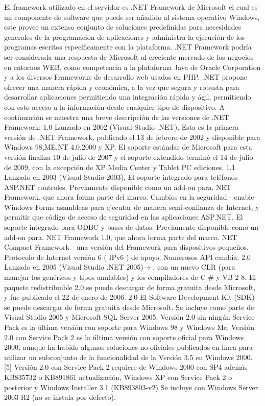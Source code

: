 El framework utilizado en el servidor es .NET Framework de Microsoft el cual es un componente de software que puede ser añadido al sistema operativo Windows, este provee un extenso conjunto de soluciones predefinidas para necesidades generales de la programacion de aplicaciones y administra la ejecución de los programas escritos específicamente con la plataforma.
.NET Framework podría ser considerada una respuesta de Microsoft al creciente mercado de los negocios en entornos WEB, como competencia a la plataforma Java de Oracle Corporation y a los diversos Frameworks de desarrollo web usados en PHP. .NET propone ofrecer una manera rápida y económica, a la vez que segura y robusta para desarrollar aplicaciones permitiendo una integración rápida y ágil, permitiendo con esto acceso a la información desde cualquier tipo de dispositivo.
A continuación se muestra una breve descripción de las versiones de .NET Framework:
1.0
Lanzado en 2002 (Visual Studio .NET), Esta es la primera versión de .NET Framework, publicado el 13 de febrero de 2002 y disponible para Windows 98,ME,NT 4.0,2000 y XP. El soporte estándar de Microsoft para esta versión finaliza 10 de julio de 2007 y el soporte extendido terminó el 14 de julio de 2009, con la excepción de XP Media Center y Tablet PC ediciones. 
1.1
Lanzado en 2003 (Visual Studio 2003), El soporte integrado para teléfonos ASP.NET controles. Previamente disponible como un add-on para. NET Framework, que ahora forma parte del marco. Cambios en la seguridad - enable Windows Forms asambleas para ejecutar de manera semi-confianza de Internet, y permitir que código de acceso de seguridad en las aplicaciones ASP.NET. El soporte integrado para ODBC y bases de datos. Previamente disponible como un add-on para. NET Framework 1.0, que ahora forma parte del marco. NET Compact Framework - una versión del Framework para dispositivos pequeños. Protocolo de Internet versión 6 ( IPv6 ) de apoyo. Numerosos API cambia.
2.0
Lanzado en 2005 (Visual Studio .NET 2005)→ , con un nuevo CLR (para manejar los genéricos y tipos anulables) y los compiladores de C \# y VB 2 8.
El paquete redistribuible 2.0 se puede descargar de forma gratuita desde Microsoft, y fue publicado el 22 de enero de 2006. 2.0 El Software Development Kit (SDK) se puede descargar de forma gratuita desde Microsoft. Se incluye como parte de Visual Studio 2005 y Microsoft SQL Server 2005. Versión 2.0 sin ningún Service Pack es la última versión con soporte para Windows 98 y Windows Me. Versión 2.0 con Service Pack 2 es la última versión con soporte oficial para Windows 2000, aunque ha habido algunas soluciones no oficiales publicados en línea para utilizar un subconjunto de la funcionalidad de la Versión 3.5 en Windows 2000. [5] Versión 2.0 con Service Pack 2 requiere de Windows 2000 con SP4 además KB835732 o KB891861 actualización, Windows XP con Service Pack 2 o posterior y Windows Installer 3.1 (KB893803-v2) Se incluye con Windows Server 2003 R2 (no se instala por defecto).

